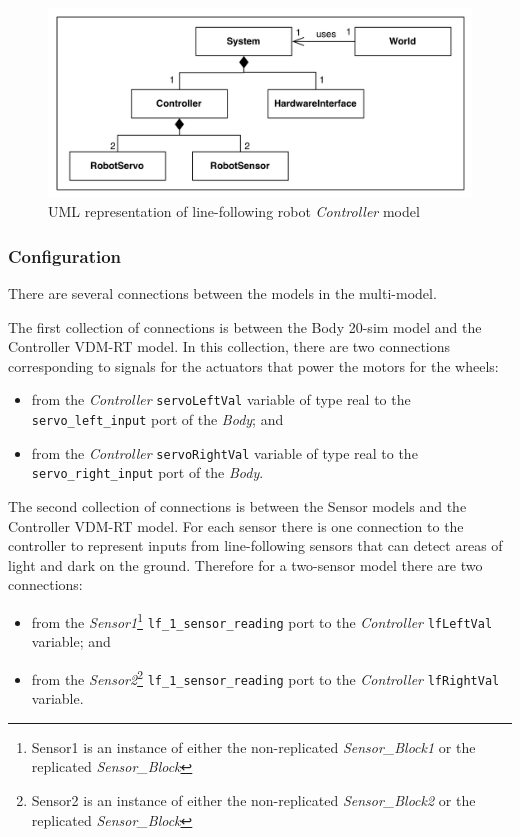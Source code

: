\begin{description}
\begin{figure}[htb!]
\begin{center}
     \includegraphics[width=0.8\linewidth]{linefollower/r2g2p_vdm} 
\caption{UML representation of line-following robot \emph{Controller} model}
\label{fig:linefollowbodyvdm}
\end{center}
\end{figure}

\end{description}

\subsubsection{Configuration}

There are several connections between the models in the multi-model.

The first collection of connections is between the Body 20-sim model and the Controller VDM-RT model. In this collection, there are two connections corresponding to signals for the actuators that power the motors for the wheels:
\begin{itemize}
  \item from the \emph{Controller} \texttt{servoLeftVal} variable of type real to the \texttt{servo\_left\_input} port of the \emph{Body}; and
  \item from the \emph{Controller} \texttt{servoRightVal} variable of type real to the \texttt{servo\_right\_input} port of the \emph{Body}. 
\end{itemize} 

The second collection of connections is between the Sensor models and the Controller VDM-RT model. For each sensor there is one connection to the controller to represent inputs from line-following sensors that can detect areas of light and dark on the ground. Therefore for a two-sensor model there are two connections:
 \begin{itemize}
  \item from the \emph{Sensor1}\footnote{Sensor1 is an instance of either the non-replicated \emph{Sensor\_Block1} or the replicated \emph{Sensor\_Block}} \texttt{lf\_1\_sensor\_reading} port to the \emph{Controller} \texttt{lfLeftVal} variable; and 
  \item from the \emph{Sensor2}\footnote{Sensor2 is an instance of either the non-replicated \emph{Sensor\_Block2} or the replicated \emph{Sensor\_Block}} \texttt{lf\_1\_sensor\_reading} port to the \emph{Controller} \texttt{lfRightVal} variable. 
\end{itemize}

